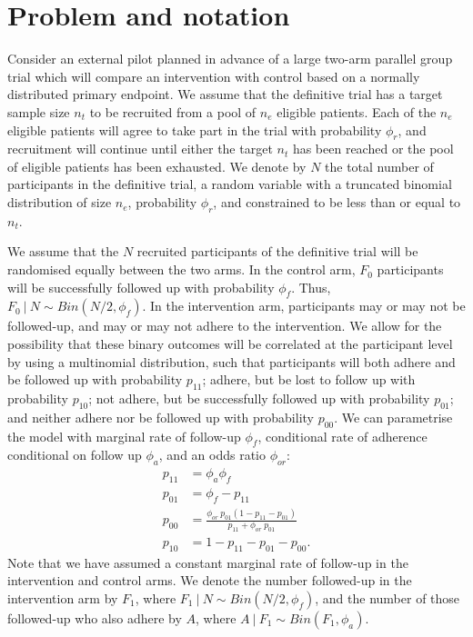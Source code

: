 \documentclass[AMA,STIX1COL]{WileyNJD-v2}
\begin{document}

\section{Problem and notation}\label{sec:problem}


Consider an external pilot planned in advance of a large two-arm parallel group trial which will compare an intervention with control based on a normally distributed primary endpoint. We assume that the definitive trial has a target sample size $n_t$ to be recruited from a pool of $n_e$ eligible patients. Each of the $n_e$ eligible patients will agree to take part in the trial with probability $\phi_r$, and recruitment will continue until either the target $n_t$ has been reached or the pool of eligible patients has been exhausted. We denote by $N$ the total number of participants in the definitive trial, a random variable with a truncated binomial distribution of size $n_e$, probability $\phi_r$, and constrained to be less than or equal to $n_t$.

We assume that the $N$ recruited participants of the definitive trial will be randomised equally between the two arms. In the control arm, $F_0$ participants will be successfully followed up with probability $\phi_f$. Thus, $F_0 ~|~ N \sim Bin(N/2, \phi_f)$. In the intervention arm, participants may or may not be followed-up, and may or may not adhere to the intervention. We allow for the possibility that these binary outcomes will be correlated at the participant level by using a multinomial distribution, such that participants will both adhere and be followed up with probability $p_{11}$; adhere, but be lost to follow up with probability $p_{10}$; not adhere, but be successfully followed up with probability $p_{01}$; and neither adhere nor be followed up with probability $p_{00}$. We can parametrise the model with marginal rate of follow-up $\phi_f$, conditional rate of adherence conditional on follow up $\phi_a$, and an odds ratio $\phi_{or}$:
\begin{align*}
p_{11} &= \phi_a \phi_f \\
p_{01} &= \phi_f - p_{11} \\
p_{00} &= \frac{\phi_{or} ~ p_{01}(1-p_{11}-p_{01})}{p_{11} + \phi_{or} ~ p_{01}} \\
p_{10} &= 1 - p_{11} - p_{01} - p_{00}.
\end{align*}
Note that we have assumed a constant marginal rate of follow-up in the intervention and control arms. We denote the number followed-up in the intervention arm by $F_1$, where $F_1 ~|~ N\sim Bin(N/2, \phi_f)$, and the number of those followed-up who also adhere by $A$, where $A ~|~ F_1 \sim Bin(F_1, \phi_a)$. 
\end{document}
